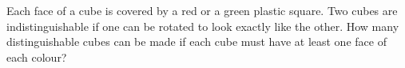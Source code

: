 Each face of a cube is covered by a red or a green plastic square. Two cubes are indistinguishable if one can be rotated to look exactly like the other. How many distinguishable cubes can be made if each cube must have at least one face of each colour?
